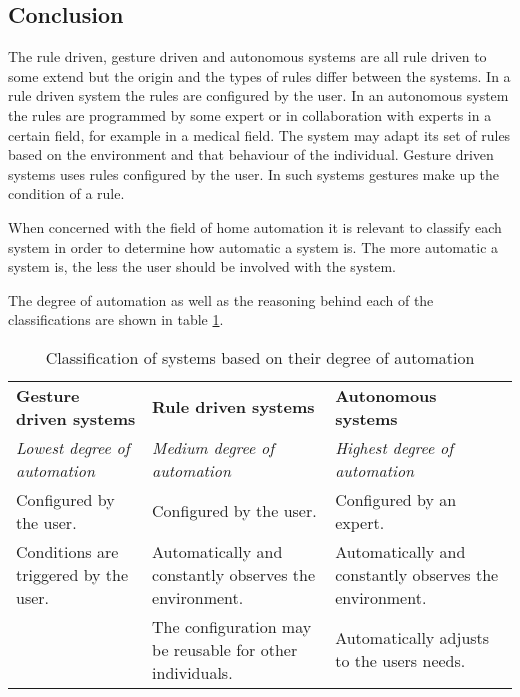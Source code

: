 
\subsection{Conclusion}

The rule driven, gesture driven and autonomous systems are all rule driven to some extend but the origin and the types of rules differ between the systems. In a rule driven system the rules are configured by the user.
In an autonomous system the rules are programmed by some expert or in collaboration with experts in a certain field, for example in a medical field. The system may adapt its set of rules based on the environment and that behaviour of the individual.
Gesture driven systems uses rules configured by the user. In such systems gestures make up the condition of a rule.

When concerned with the field of home automation it is relevant to classify each system in order to determine how automatic a system is. The more automatic a system is, the less the user should be involved with the system.

The degree of automation as well as the reasoning behind each of the classifications are shown in table \ref{tbl:system-categories}.

\begin{table}[h]
\centering
\caption{Classification of systems based on their degree of automation}
\label{tbl:system-categories}
\begin{tabularx}{\textwidth}{XXX}
\textbf{Gesture driven systems} & \textbf{Rule driven systems} & \textbf{Autonomous systems} \\
\textit{Lowest degree of automation}
&
\textit{Medium degree of automation}
& 
\textit{Highest degree of automation}\\
Configured by the user.
&
Configured by the user.
& 
Configured by an expert.\\
Conditions are triggered by the user.
&
Automatically and constantly observes the environment.
&
Automatically and constantly observes the environment.\\
~
&
The configuration may be reusable for other individuals.
&
Automatically adjusts to the users needs.\\
\end{tabularx}
\end{table}

